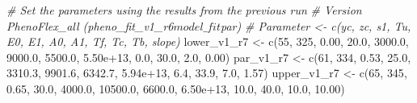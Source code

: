 \documentclass[
]{article}
\newenvironment{Shaded}{\begin{snugshade}}{\end{snugshade}}
\newcommand{\CommentTok}[1]{\textcolor[rgb]{0.56,0.35,0.01}{\textit{#1}}}
\newcommand{\DecValTok}[1]{\textcolor[rgb]{0.00,0.00,0.81}{#1}}
\newcommand{\FloatTok}[1]{\textcolor[rgb]{0.00,0.00,0.81}{#1}}
\newcommand{\FunctionTok}[1]{\textcolor[rgb]{0.00,0.00,0.00}{#1}}
\newcommand{\NormalTok}[1]{#1}
\newcommand{\OtherTok}[1]{\textcolor[rgb]{0.56,0.35,0.01}{#1}}
\begin{document}
\begin{Shaded}
\begin{Highlighting}[]
\CommentTok{\# Set the parameters using the results from the previous run}
\CommentTok{\# Version PhenoFlex\_all (pheno\_fit\_v1\_r6$model\_fit$par)}
\CommentTok{\# Parameter \textless{}{-} c(yc,  zc,   s1,   Tu,     E0,      E1,     A0,       A1,   Tf,   Tc,   Tb, slope)}
\NormalTok{lower\_v1\_r7 }\OtherTok{\textless{}{-}} \FunctionTok{c}\NormalTok{(}\DecValTok{55}\NormalTok{, }\DecValTok{325}\NormalTok{, }\FloatTok{0.00}\NormalTok{, }\FloatTok{20.0}\NormalTok{, }\FloatTok{3000.0}\NormalTok{,  }\FloatTok{9000.0}\NormalTok{, }\FloatTok{5500.0}\NormalTok{, }\FloatTok{5.50e+13}\NormalTok{,  }\FloatTok{0.0}\NormalTok{, }\FloatTok{30.0}\NormalTok{,  }\FloatTok{2.0}\NormalTok{,  }\FloatTok{0.00}\NormalTok{)}
\NormalTok{par\_v1\_r7   }\OtherTok{\textless{}{-}} \FunctionTok{c}\NormalTok{(}\DecValTok{61}\NormalTok{, }\DecValTok{334}\NormalTok{, }\FloatTok{0.53}\NormalTok{, }\FloatTok{25.0}\NormalTok{, }\FloatTok{3310.3}\NormalTok{,  }\FloatTok{9901.6}\NormalTok{, }\FloatTok{6342.7}\NormalTok{, }\FloatTok{5.94e+13}\NormalTok{,  }\FloatTok{6.4}\NormalTok{, }\FloatTok{33.9}\NormalTok{,  }\FloatTok{7.0}\NormalTok{,  }\FloatTok{1.57}\NormalTok{)}
\NormalTok{upper\_v1\_r7 }\OtherTok{\textless{}{-}} \FunctionTok{c}\NormalTok{(}\DecValTok{65}\NormalTok{, }\DecValTok{345}\NormalTok{, }\FloatTok{0.65}\NormalTok{, }\FloatTok{30.0}\NormalTok{, }\FloatTok{4000.0}\NormalTok{, }\FloatTok{10500.0}\NormalTok{, }\FloatTok{6600.0}\NormalTok{, }\FloatTok{6.50e+13}\NormalTok{, }\FloatTok{10.0}\NormalTok{, }\FloatTok{40.0}\NormalTok{, }\FloatTok{10.0}\NormalTok{, }\FloatTok{10.00}\NormalTok{)}



\end{Highlighting}
\end{Shaded}
\end{document}
